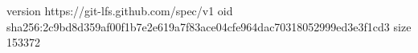 version https://git-lfs.github.com/spec/v1
oid sha256:2c9bd8d359af00f1b7e2e619a7f83ace04cfe964dac70318052999ed3e3f1cd3
size 153372

